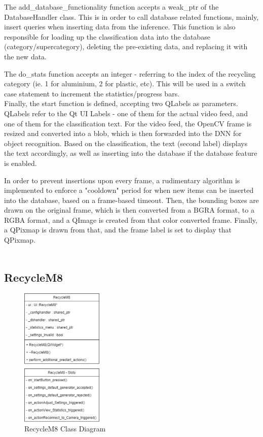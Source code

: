 \documentclass[conference]{IEEEtran}
\begin{document}
The add\_database\_functionality function accepts a weak\_ptr of the DatabaseHandler class. This is in order to call database related functions, mainly, insert queries when inserting data from the inference. This function is also responsible for loading up the classification data into the database (category/supercategory), deleting the pre-existing data, and replacing it with the new data.

The do\_stats function accepts an integer - referring to the index of the recycling category (ie. 1 for aluminium, 2 for plastic, etc). This will be used in a switch case statement to increment the statistics/progress bars.\\

Finally, the start function is defined, accepting two QLabels as parameters. QLabels refer to the Qt UI Labels - one of them for the actual video feed, and one of them for the classification text. For the video feed, the OpenCV frame is resized and converted into a blob, which is then forwarded into the DNN for object recognition. Based on the classification, the text (second label) displays the text accordingly, as well as inserting into the database if the database feature is enabled.

In order to prevent insertions upon every frame, a rudimentary algorithm is implemented to enforce a "cooldown" period for when new items can be inserted into the database, based on a frame-based timeout. Then, the bounding boxes are drawn on the original frame, which is then converted from a BGRA format, to a RGBA format, and a QImage is created from that color converted frame. Finally, a QPixmap is drawn from that, and the frame label is set to display that QPixmap.~\\~\\

\subsection{RecycleM8}

\begin{figure}[h]
    \centering
    \includegraphics[width=0.35\textwidth]{images/code_diagrams/recyclem8.eps}
    \caption{RecycleM8 Class Diagram}
\end{figure}~\\
\end{document}
